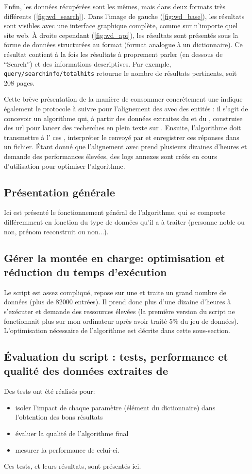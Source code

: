Enfin, les données récupérées sont les mêmes, mais dans deux formats très différents (\ref{fig:wd_search}). Dans l'image de gauche (\ref{fig:wd_base}), les résultats sont visibles avec une interface graphique complète, comme sur n'importe quel site web. À droite cependant (\ref{fig:wd_api}), les résultats sont présentés sous la forme de données structurées au format \json{} (format analogue à un \gls{dictionnaire}). Ce résultat contient à la fois les résultats à proprement parler (en dessous de \enquote{Search}) et des informations descriptives. Par exemple, \texttt{query/searchinfo/totalhits} retourne le nombre de résultats pertinents, soit 208 pages.

Cette brève présentation de la manière de consommer concrètement une \api{} indique également le protocole à suivre pour l'alignement des \tname{} avec des entités \wkd{}: il s'agit de concevoir un algorithme qui, à partir des données extraites du \tname{} et du \ttrait{}, construise des \gls{url} pour lancer des recherches en plein texte sur \wkd{}. Ensuite, l'algorithme doit transmettre à l'\api{} ces \url{}, interpréter le \json{} renvoyé par \wkd{} et enregistrer ces réponses dans un fichier. Étant donné que l'alignement avec \wkd{} prend plusieurs dizaines d'heures et demande des performances élevées, des \glspl{log} annexes sont créés en cours d'utilisation pour optimiser l'algorithme.


\subsection{Présentation générale}
Ici est présenté le fonctionnement général de l'algorithme, qui se comporte différemment en fonction du type de données qu'il a à traiter (personne noble ou non, prénom reconstruit ou non...).

\subsection{Gérer la montée en charge: optimisation et réduction du temps d'exécution}
Le script est assez compliqué, repose sur une \api{} et traite un grand nombre de données (plus de 82000 entrées). Il prend donc plus d'une dizaine d'heures à s'exécuter et demande des ressources élevées (la première version du script ne fonctionnait plus sur mon ordinateur après avoir traité 5\% du jeu de données). L'optimisation nécessaire de l'algorithme est décrite dans cette sous-section.

\subsection{Évaluation du script : tests, performance et qualité des données extraites de \wkd{}}
Des tests ont été réalisés pour:
\begin{itemize}
	\item isoler l'impact de chaque paramètre (élément du dictionnaire) dans l'obtention des bons résultats
	\item évaluer la qualité de l'algorithme final
	\item mesurer la performance de celui-ci.
\end{itemize}
Ces tests, et leurs résultats, sont présentés ici.

